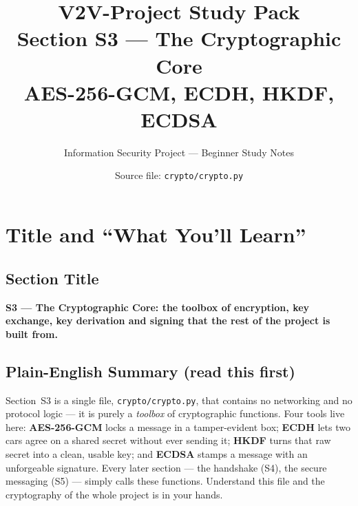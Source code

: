 \documentclass[11pt,a4paper]{article}
\title{\textbf{V2V-Project Study Pack}\\[4pt]
       \large Section S3 --- The Cryptographic Core\\
       \large \normalsize AES-256-GCM, ECDH, HKDF, ECDSA}
\author{Information Security Project --- Beginner Study Notes}
\date{Source file: \texttt{crypto/crypto.py}}
\begin{document}
\maketitle
\tableofcontents
\newpage

\section{Title and ``What You'll Learn''}

\subsection*{Section Title}
\textbf{S3 --- The Cryptographic Core: the toolbox of encryption, key exchange,
key derivation and signing that the rest of the project is built from.}

\subsection*{Plain-English Summary (read this first)}
Section~S3 is a single file, \texttt{crypto/crypto.py}, that contains no
networking and no protocol logic --- it is purely a \emph{toolbox} of
cryptographic functions. Four tools live here: \textbf{AES-256-GCM} locks a
message in a tamper-evident box; \textbf{ECDH} lets two cars agree on a shared
secret without ever sending it; \textbf{HKDF} turns that raw secret into a clean,
usable key; and \textbf{ECDSA} stamps a message with an unforgeable signature.
Every later section --- the handshake (S4), the secure messaging (S5) --- simply
calls these functions. Understand this file and the cryptography of the whole
project is in your hands.
\end{document}
